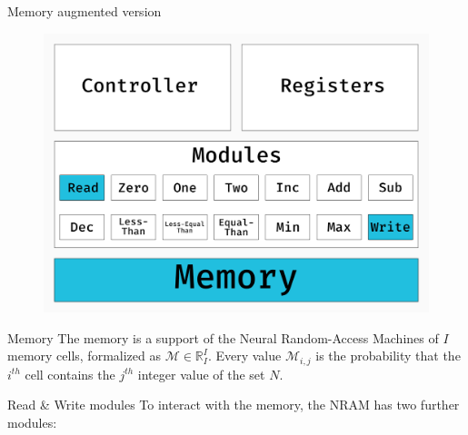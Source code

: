 \documentclass[xcolor={usenames}]{beamer}
\begin{document}
  \begin{frame}{Memory augmented version}
  	\begin{figure}
  		\centering
  		\includegraphics[width=\textwidth]{../figures/schema-nram-with-memory.png}
  	\end{figure}
  \end{frame}
  \begin{frame}{Memory}
  	The memory is a support of the Neural Random-Access Machines of $I$ memory cells, formalized as $\mathcal{M}\in\mathbb{R}^I_I$. Every value $\mathcal{M}_{i,j}$ is the probability that the $i^{th}$ cell contains the $j^{th}$ integer value of the set $N$.
  \end{frame}
  \begin{frame}{Read \& Write modules}
  	To interact with the memory, the NRAM has two further modules:
  	\begin{itemize}
  	\end{itemize}
  \end{frame}
\end{document}
